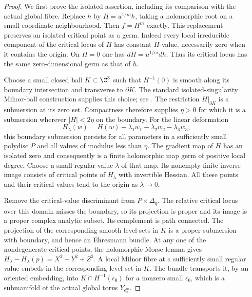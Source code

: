 \begin{proof}
We first prove the isolated assertion, including its
comparison with the actual global fibre. Replace $h$
by $H=u^{1/m}h$, taking a holomorphic root on a small
coordinate neighbourhood. Then $f=H^m$ exactly.
This replacement preserves an isolated critical point
as a germ. Indeed every local irreducible component
of the critical locus of $H$ has constant $H$-value,
necessarily zero when it contains the origin. On
$H=0$ one has $dH=u^{1/m}dh$. Thus its critical
locus has the same zero-dimensional germ as that
of $h$.

Choose a small closed ball $K\subset\C^3$ such that
$H^{-1}(0)$ is smooth along its boundary intersection
and transverse to $\partial K$.
The standard isolated-singularity Milnor-ball
construction supplies this choice; see
\cite[Lemma 6.1 and Appendix B]{Milnor1968}.
The restriction $H|_{\partial K}$ is a submersion
at its zero set. Compactness therefore supplies
$\eta>0$ for which it is a submersion wherever
$|H|<2\eta$ on the boundary. For the linear
deformation
\[
 H_\lambda(w)=H(w)-\lambda_1w_1
                         -\lambda_2w_2-\lambda_3w_3,
                                                        \tag{A.J.38a}
\]
this boundary submersion persists for all parameters
in a sufficiently small polydisc $P$ and all values
of modulus less than $\eta$. The gradient map of
$H$ has an isolated zero and consequently is a finite
holomorphic map germ of positive local degree. Choose
a small regular value $\lambda$ of that map. Its
nonempty finite inverse image consists of critical
points of $H_\lambda$ with invertible Hessian. All
these points and their critical values tend to the
origin as $\lambda\to0$.

Remove the critical-value discriminant from
$P\times\Delta_\eta$. The relative critical locus
over this domain misses the boundary, so its
projection is proper and its image is a proper
complex analytic subset. Its complement is path
connected. The projection of the corresponding
smooth level sets in $K$ is a proper submersion
with boundary, and hence an Ehresmann bundle.
At any one of the nondegenerate critical points,
the holomorphic Morse lemma gives
$H_\lambda-H_\lambda(p)=X^2+Y^2+Z^2$.
A local Milnor fibre at a sufficiently small regular
value embeds in the corresponding level set in $K$.
The bundle transports it, by an oriented embedding,
into $K\cap H^{-1}(\epsilon_0)$ for a nonzero small
$\epsilon_0$, which is a submanifold of the actual
global torus $Y_{\epsilon_0^m}$.


\end{proof}
